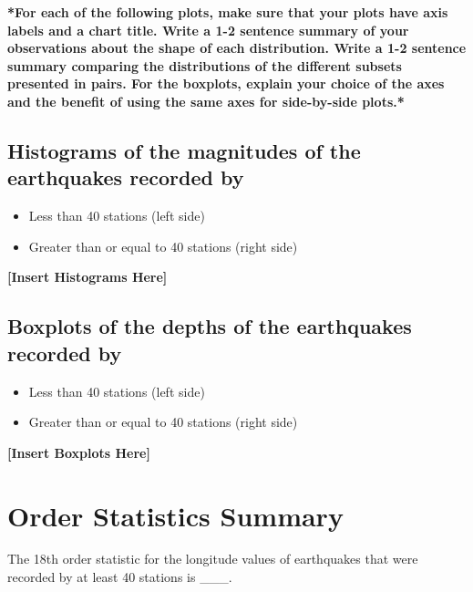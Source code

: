 \documentclass[12pt]{article}
\begin{document}
\textbf{*For each of the following plots, make sure that your plots have axis labels and a chart title. Write a 1-2 sentence summary of your observations about the shape of each distribution. Write a 1-2 sentence summary comparing the distributions of the different subsets presented in pairs. For the boxplots, explain your choice of the axes and the benefit of using the same axes for side-by-side plots.*}

\subsection*{Histograms of the magnitudes of the earthquakes recorded by}
\begin{itemize}
    \item Less than 40 stations (left side)
    \item Greater than or equal to 40 stations (right side)
\end{itemize}
\textbf{[Insert Histograms Here]}

\subsection*{Boxplots of the depths of the earthquakes recorded by}
\begin{itemize}
    \item Less than 40 stations (left side)
    \item Greater than or equal to 40 stations (right side)
\end{itemize}
\textbf{[Insert Boxplots Here]}

\section*{Order Statistics Summary}
The 18th order statistic for the longitude values of earthquakes that were recorded by at least 40 stations is \_\_\_.
\end{document}
